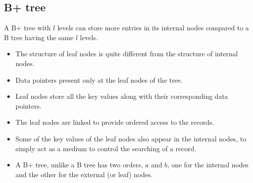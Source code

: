 \documentclass[10pt, a4paper]{extarticle}
\theoremstyle{definition}
\begin{document}
\subsection{B+ tree}
A B+ tree with $l$ levels can store more entries in its internal nodes compared to a B tree having the same $l$ levels.


\begin{itemize}
	\item The structure of leaf nodes is quite different from the structure of internal nodes.
	\item Data pointers present only at the leaf nodes of the tree.
	\item Leaf nodes store all the key values along with their corresponding data pointers.
	\item The leaf nodes are linked to provide ordered access to the records.
	\item Some of the key values of the leaf nodes also appear in the internal nodes, to simply act as a medium to control the searching of a record.
	\item A B+ tree, unlike a B tree has two orders, $a$ and $b$, one for the internal nodes and the other for the external (or leaf) nodes.
\end{itemize}
\end{document}
